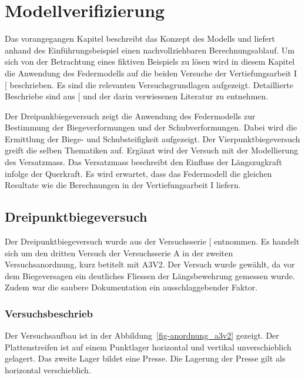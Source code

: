 \documentclass[
  11pt,
  letterpaper,
]{scrreprt}
\begin{document}

\chapter{Modellverifizierung}\label{sec-verifizierung}

Das vorangegangen Kapitel beschreibt das Konzept des Modells und liefert
anhand des Einführungsbeispiel einen nachvollziehbaren
Berechnungsablauf. Um sich von der Betrachtung eines fiktiven Beispiels
zu lösen wird in diesem Kapitel die Anwendung des Federmodells auf die
beiden Versuche der Vertiefungsarbeit I
{[}\citeproc{ref-gitz_ansatze_2024}{1}{]} beschrieben. Es sind die
relevanten Versuchsgrundlagen aufgezeigt. Detaillierte Beschriebe sind
aus {[}\citeproc{ref-gitz_ansatze_2024}{1}{]} und der darin verwiesenen
Literatur zu entnehmen.

Der Dreipunkbiegeversuch zeigt die Anwendung des Federmodells zur
Bestimmung der Biegeverformungen und der Schubverformungen. Dabei wird
die Ermittlung der Biege- und Schubsteifigkeit aufgezeigt. Der
Vierpunktbiegeversuch greift die selben Thematiken auf. Ergänzt wird der
Versuch mit der Modellierung des Versatzmass. Das Versatzmass beschreibt
den Einfluss der Längszugkraft infolge der Querkraft. Es wird erwartet,
dass das Federmodell die gleichen Resultate wie die Berechnungen in der
Vertiefungsarbeit I liefern.

\section{Dreipunktbiegeversuch}\label{dreipunktbiegeversuch}

Der Dreipunktbiegeversuch wurde aus der Versuchsserie
{[}\citeproc{ref-jager_versuche_2006}{2}{]} entnommen. Es handelt sich
um den dritten Versuch der Versuchsserie A in der zweiten
Versuchsanordnung, kurz betitelt mit A3V2. Der Versuch wurde gewählt, da
vor dem Biegeversagen ein deutliches Fliessen der Längsbewehrung
gemessen wurde. Zudem war die saubere Dokumentation ein
ausschlaggebender Faktor.

\subsection{Versuchsbeschrieb}\label{versuchsbeschrieb}

Der Versuchsaufbau ist in der Abbildung~\ref{fig-anordnung_a3v2}
gezeigt. Der Plattenstreifen ist auf einem Punktlager horizontal und
vertikal unverschieblich gelagert. Das zweite Lager bildet eine Presse.
Die Lagerung der Presse gilt als horizontal verschieblich.
\end{document}
